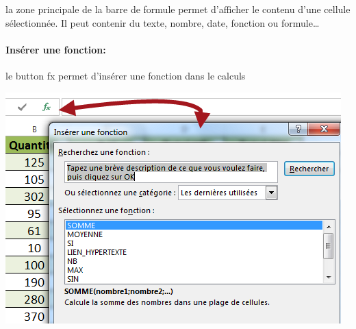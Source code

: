 \subsection*{}
\begin{definition}
	la zone principale de la barre de formule permet d’afficher le contenu d’une cellule sélectionnée. Il peut contenir du texte, nombre, date, fonction ou formule…
	\paragraph{Insérer une fonction:}{le button fx permet d’insérer une fonction dans le calculs}
\end{definition}
\begin{center} 
	\includegraphics[scale=0.2,width=\linewidth]{img/barre_formule} 
	 \label{rdp}
\end{center}

